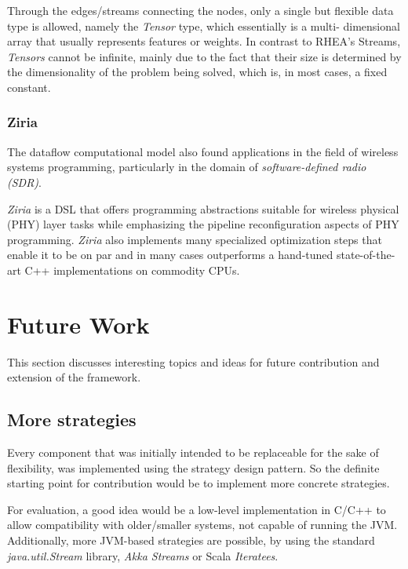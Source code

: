 \documentclass[sigplan,review,anonymous]{acmart}
\begin{document}
Through the edges/streams connecting the nodes, only a single but flexible data
type is allowed, namely the \textit{Tensor} type, which essentially is a multi-
dimensional array that usually represents features or weights. In contrast to
\textsc{RHEA}'s Streams, \textit{Tensors} cannot be infinite, mainly due to the
fact that their size is determined by the dimensionality of the problem being
solved, which is, in most cases, a fixed constant.

\subsubsection{Ziria}

The dataflow computational model also found applications in the field of
wireless systems programming, particularly in the domain of
\textit{software-defined radio (SDR)}.

\textit{Ziria}\cite{ziria} is a DSL that offers programming abstractions suitable
for wireless physical (PHY) layer tasks while emphasizing the pipeline
reconfiguration aspects of PHY programming. \textit{Ziria} also implements many
specialized optimization steps that enable it to be on par and in many cases
outperforms a hand-tuned state-of-the-art C++ implementations on commodity
CPUs.

\section{Future Work} \label{sec:future}

This section discusses interesting topics and ideas for future contribution and
extension of the framework.

\subsection{More strategies}

Every component that was initially intended to be replaceable for the sake of
flexibility, was implemented using the strategy design pattern. So the definite
starting point for contribution would be to implement more concrete strategies.

For evaluation, a good idea would be a low-level implementation in C/C++ to
allow compatibility with older/smaller systems, not capable of running the JVM.
Additionally, more JVM-based strategies are possible, by using the standard
\textit{java.util.Stream}
library,
\textit{Akka Streams} or Scala \textit{Iteratees}\cite{iteratees}.
\end{document}
